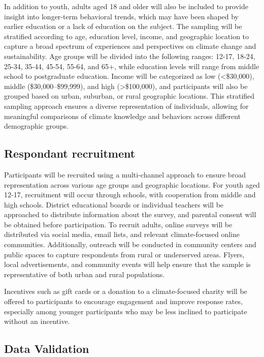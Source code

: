 \documentclass[
  letterpaper,
  DIV=11,
  numbers=noendperiod]{scrartcl}
\begin{document}
In addition to youth, adults aged 18 and older will also be included to
provide insight into longer-term behavioral trends, which may have been
shaped by earlier education or a lack of education on the subject. The
sampling will be stratified according to age, education level, income,
and geographic location to capture a broad spectrum of experiences and
perspectives on climate change and sustainability. Age groups will be
divided into the following ranges: 12-17, 18-24, 25-34, 35-44, 45-54,
55-64, and 65+, while education levels will range from middle school to
postgraduate education. Income will be categorized as low
(\textless\$30,000), middle (\$30,000--\$99,999), and high
(\textgreater\$100,000), and participants will also be grouped based on
urban, suburban, or rural geographic locations. This stratified sampling
approach ensures a diverse representation of individuals, allowing for
meaningful comparisons of climate knowledge and behaviors across
different demographic groups.

\subsection{Respondant recruitment}\label{respondant-recruitment}

Participants will be recruited using a multi-channel approach to ensure
broad representation across various age groups and geographic locations.
For youth aged 12-17, recruitment will occur through schools, with
cooperation from middle and high schools. District educational boards or
individual teachers will be approached to distribute information about
the survey, and parental consent will be obtained before participation.
To recruit adults, online surveys will be distributed via social media,
email lists, and relevant climate-focused online communities.
Additionally, outreach will be conducted in community centers and public
spaces to capture respondents from rural or underserved areas. Flyers,
local advertisements, and community events will help ensure that the
sample is representative of both urban and rural populations.

Incentives such as gift cards or a donation to a climate-focused charity
will be offered to participants to encourage engagement and improve
response rates, especially among younger participants who may be less
inclined to participate without an incentive.

\subsection{Data Validation}\label{data-validation}
\end{document}
